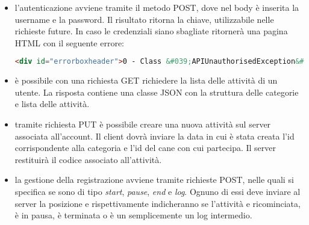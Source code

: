 \begin{itemize}
  \item l'autenticazione avviene tramite il metodo POST, dove nel body è inserita la username e la password. Il
  risultato ritorna la chiave, utilizzabile nelle richieste future. In caso le credenziali siano sbagliate ritornerà una
  pagina HTML con il seguente errore:
  \begin{lstlisting}[language=HTML]
    <div id="errorboxheader">0 - Class &#039;APIUnauthorisedException&#039; not found</div>
  \end{lstlisting}
  \item è possibile con una richiesta GET richiedere la lista delle attività di un utente. La risposta contiene una
  classe JSON con la struttura delle categorie e lista delle attività. 
  \item tramite richiesta PUT è possibile creare una nuova attività sul server associata all'account. Il client dovrà
  inviare la data in cui è stata creata l'id corrispondente alla categoria e l'id del cane con cui partecipa. Il server
  restituirà il codice associato all'attività.
  \item la gestione della registrazione avviene tramite richieste POST, nelle quali si specifica se sono di tipo
  \textit{start}, \textit{pause}, \textit{end} e \textit{log}. Ognuno di essi deve inviare al server la posizione e
  rispettivamente indicheranno se l'attività e ricominciata, è in pausa, è terminata o è un semplicemente un log intermedio.
\end{itemize}

